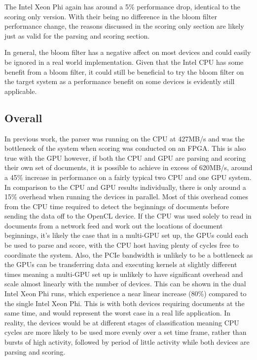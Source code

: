 The Intel Xeon Phi again has around a 5\% performance drop, identical to the
scoring only version. With their being no difference in the bloom filter
performance change, the reasons discussed in the scoring only section are likely
just as valid for the parsing and scoring section.

In general, the bloom filter has a negative affect on most devices and could
easily be ignored in a real world implementation. Given that the Intel CPU
has some benefit from a bloom filter, it could still be beneficial to try the
bloom filter on the target system as a performance benefit on some devices is
evidently still applicable.

\subsection{Overall}

In previous work, the parser was running on the CPU at 427MB/s
\cite{HybridCPUFPGA} and was the bottleneck of the system when scoring was
conducted on an FPGA. This is also true with the GPU however, if both the CPU
and GPU are parsing and scoring their own set of documents, it is possible to
achieve in excess of 620MB/s, around a 45\% increase in performance on a fairly
typical two CPU and one GPU system. In comparison to the CPU and GPU results
individually, there is only around a 15\% overhead when running the devices in
parallel. Most of this overhead comes from the CPU time required to detect the
beginnings of documents before sending the data off to the OpenCL device. If the
CPU was used solely to read in documents from a network feed and work out the
locations of document beginnings, it's likely the case that in a multi-GPU set
up, the GPUs could each be used to parse and score, with the CPU host having
plenty of cycles free to coordinate the system. Also, the PCIe bandwidth is
unlikely to be a bottleneck as the GPUs can be transferring data and executing
kernels at slightly different times meaning a multi-GPU set up is unlikely to
have significant overhead and scale almost linearly with the number of devices.
This can be shown in the dual Intel Xeon Phi runs, which experience a near
linear increase (80\%) compared to the single Intel Xeon Phi. This is with both
devices requiring documents at the same time, and would represent the worst
case in a real life application. In reality, the devices would be at different
stages of classification meaning CPU cycles are more likely to be used more
evenly over a set time frame, rather than bursts of high activity, followed by
period of little activity while both devices are parsing and scoring.
